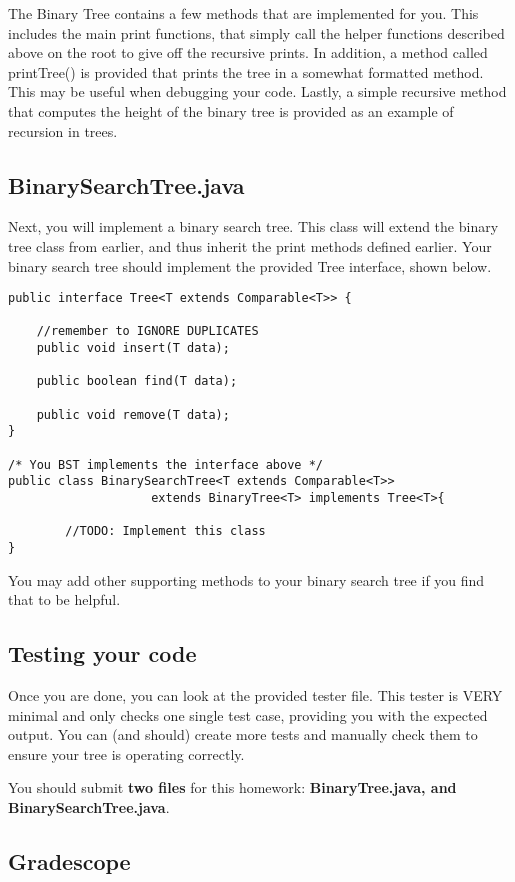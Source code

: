 \documentclass[paper=a4, fontsize=11pt, parskip=full]{scrartcl} %
\numberwithin{equation}{section} %
\numberwithin{figure}{section} %
\numberwithin{table}{section} %
\begin{document}
The Binary Tree contains a few methods that are implemented for you. This includes the main print functions, that simply call the helper functions described above on the root to give off the recursive prints. In addition, a method called printTree() is provided that prints the tree in a somewhat formatted method. This may be useful when debugging your code. Lastly, a simple recursive method that computes the height of the binary tree is provided as an example of recursion in trees.

\subsection{BinarySearchTree.java}

Next, you will implement a binary search tree. This class will extend the binary tree class from earlier, and thus inherit the print methods defined earlier. Your binary search tree should implement the provided Tree interface, shown below. 

\begin{lstlisting}
public interface Tree<T extends Comparable<T>> {
	
	//remember to IGNORE DUPLICATES
	public void insert(T data);
	
	public boolean find(T data);

	public void remove(T data);
}

/* You BST implements the interface above */
public class BinarySearchTree<T extends Comparable<T>>
					extends BinaryTree<T> implements Tree<T>{

		//TODO: Implement this class
}
\end{lstlisting}

You may add other supporting methods to your binary search tree if you find that to be helpful. 

\subsection{Testing your code}

Once you are done, you can look at the provided tester file. This tester is VERY minimal and only checks one single test case, providing you with the expected output. You can (and should) create more tests and manually check them to ensure your tree is operating correctly.

You should submit \textbf{two files} for this homework: \textbf{BinaryTree.java, and BinarySearchTree.java}.

\subsection{Gradescope}
\end{document}
